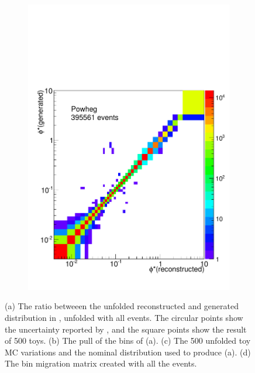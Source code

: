 \begin{figure}[!htbp]
\begin{subfigure}[b]{\SideBySidePlotWidth}
        \includegraphics[width=\textwidth]{figures/BinM_P_ALL.pdf}
        \caption{}
        \label{fig:bin_migration_all}
    \end{subfigure}
    \caption[
        Full uncertainty propegation using all \POWHEG events to unfold
        \MADGRAPH.
    ]{
        (a) The ratio betweeen the unfolded reconstructed and generated \phistar
        distribution in \MADGRAPH, unfolded with all \POWHEG events. The
        circular points show the uncertainty reported by \RooUnfold, and the
        square points show the result of \num{500} toys. (b) The pull of the
        bins of (a). (c) The \num{500} unfolded toy MC variations and the
        nominal distribution used to produce (a). (d) The bin migration matrix
        created with all the \POWHEG events.
    }
\label{fig:full_propegation_unfolding}
\end{figure}

